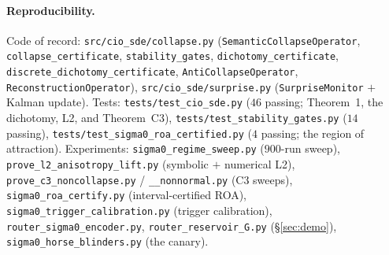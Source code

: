 \documentclass[11pt]{article}
\theoremstyle{definition}
\begin{document}
\paragraph{Reproducibility.}
Code of record: \texttt{src/cio\_sde/collapse.py} (\texttt{SemanticCollapseOperator},
\texttt{collapse\_certificate}, \texttt{stability\_gates}, \texttt{dichotomy\_certificate},
\texttt{discrete\_\allowbreak dichotomy\_\allowbreak certificate}, \texttt{AntiCollapseOperator},
\texttt{ReconstructionOperator}), \texttt{src/cio\_sde/surprise.py} (\texttt{SurpriseMonitor}
$+$ Kalman update). Tests: \texttt{tests/\allowbreak test\_cio\_sde.py} ($46$ passing; Theorem~1,
the dichotomy, L2, and Theorem~C3), \texttt{tests/\allowbreak test\_stability\_gates.py}
($14$ passing), \texttt{tests/\allowbreak test\_sigma0\_\allowbreak roa\_\allowbreak certified.py}
($4$ passing; the region of attraction). Experiments: \texttt{sigma0\_\allowbreak regime\_\allowbreak sweep.py} ($900$-run sweep),
\texttt{prove\_\allowbreak l2\_\allowbreak anisotropy\_\allowbreak lift.py} (symbolic $+$ numerical L2),
\texttt{prove\_\allowbreak c3\_\allowbreak noncollapse.py} / \texttt{\_\_nonnormal.py} (C3 sweeps),
\texttt{sigma0\_\allowbreak roa\_\allowbreak certify.py} (interval-certified ROA),
\texttt{sigma0\_\allowbreak trigger\_\allowbreak calibration.py} (trigger calibration),
\texttt{router\_\allowbreak sigma0\_\allowbreak encoder.py}, \texttt{router\_\allowbreak reservoir\_\allowbreak G.py} (\S\ref{sec:demo}),
\texttt{sigma0\_\allowbreak horse\_\allowbreak blinders.py} (the canary).
\end{document}
